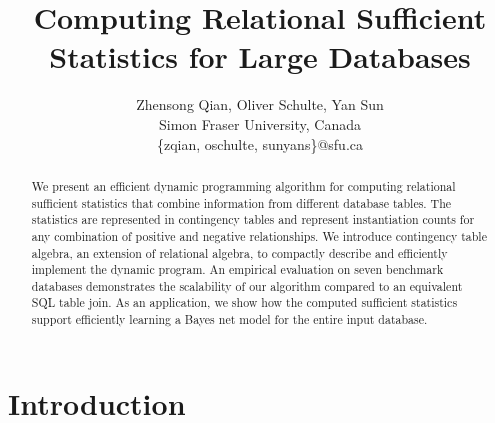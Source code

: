 \documentclass{vldb}
\begin{document}
\title{Computing Relational Sufficient Statistics for  Large Databases}

\author{
Zhensong Qian, Oliver Schulte, Yan Sun\\
 Simon Fraser University, Canada\\
\{zqian, oschulte, sunyans\}@sfu.ca
}

\maketitle  
\begin{abstract} 
We present an efficient dynamic programming algorithm for computing relational sufficient statistics that combine information from different database tables. The statistics are represented in contingency tables and represent instantiation counts for any combination of positive and negative relationships. We introduce contingency table algebra, an extension of relational algebra, to compactly describe and efficiently implement the dynamic program. An empirical evaluation on seven benchmark databases demonstrates the scalability of our algorithm compared to an equivalent SQL table join. As an application, we show how the computed sufficient statistics support efficiently learning a Bayes net model for the entire input database.
 \end{abstract}
%
%
%
%


\section{Introduction} 
\end{document}
